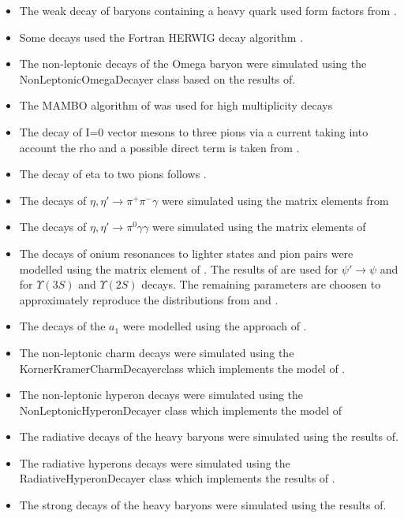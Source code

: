 \documentclass{article}
\begin{document}
\begin{itemize}
\item The weak decay of baryons containing a heavy quark used form factors from \cite{Cheng:1995fe,Cheng:1996cs}.
\item Some decays used the Fortran HERWIG decay algorithm \cite{Corcella:2000bw}.
\item The  non-leptonic decays of the Omega baryon were simulated using the NonLeptonicOmegaDecayer class based on the results of\cite{Borasoy:1999ip}.
\item The MAMBO algorithm of \cite{Kleiss:1991rn} was used for high multiplicity decays
\item The decay of I=0 vector mesons to three pions via a current taking into account the rho and a possible direct term is taken from \cite{Aloisio:2003ur}.
\item The decay of eta to two pions follows \cite{Beisert:2003zs,Gormley:1970qz,Tippens:2001fm}.
\item The decays of $\eta,\eta'\to\pi^+\pi^-\gamma$ were simulated using the matrix elements from \cite{Venugopal:1998fq,Holstein:2001bt}
\item The decays of $\eta,\eta'\to\pi^0\gamma\gamma$ were simulated using the matrix elements of \cite{Holstein:2001bt}
\item The decays of onium resonances to lighter states and pion pairs were modelled using the matrix element of \cite{Brown:1975dz}. The results of \cite{Bai:1999mj} are used for $\psi'\to\psi$ and \cite{Cronin-Hennessy:2007sj} for $\Upsilon(3S)$ and $\Upsilon(2S)$ decays. The remaining parameters are choosen to approximately reproduce the distributions from \cite{Aubert:2006bm} and \cite{Adam:2005mr}.
\item The decays of the $a_1$ were modelled using the approach of \cite{Kuhn:1990ad}.

\item The non-leptonic charm decays were simulated using the KornerKramerCharmDecayerclass which implements the model of \cite{Korner:1992wi}.
\item The non-leptonic hyperon decays were simulated using the NonLeptonicHyperonDecayer class which implements the model of\cite{Borasoy:1999md}
\item The radiative decays of the heavy baryons were simulated using the results of\cite{Ivanov:1999bk,Ivanov:1998wj}.
\item The radiative hyperons decays were simulated using the RadiativeHyperonDecayer class which implements the results of \cite{Borasoy:1999nt}.
\item The strong decays of the heavy baryons were simulated using the results of\cite{Ivanov:1999bk}.
\end{itemize}
\end{document}
